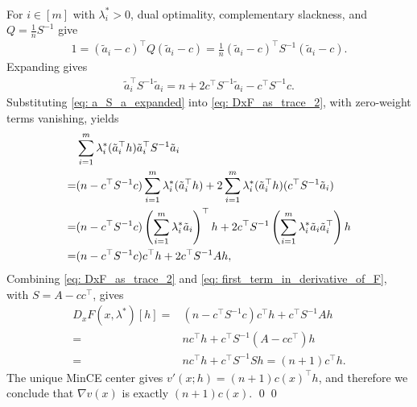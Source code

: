 \documentclass[smallextended]{svjour3}
\let\springerproof\proof
\let\endspringerproof\endproof
\renewenvironment{proof}{\springerproof}{%
  \ifhmode\qed\else\leavevmode\qed\fi\endspringerproof}
\begin{document}
\begin{proof}
\begin{align}
    \end{align}
    For $i\in[m]$ with $\lambda_i^*>0$,
    dual optimality, complementary slackness, and $Q=\frac1nS^{-1}$ give
    \begin{align*}
        1 = (\tilde{a}_i - c)^\top Q (\tilde{a}_i - c) = \frac{1}{n}(\tilde{a}_i - c)^\top S^{-1} (\tilde{a}_i - c).
    \end{align*}
    Expanding gives
    \begin{align}\label{eq: a_S_a_expanded}
        \tilde{a}_i^\top S^{-1}\tilde{a}_i = n + 2c^\top S^{-1}\tilde{a}_i -c^\top S^{-1}c.
    \end{align}
    Substituting \eqref{eq: a_S_a_expanded} into
    \eqref{eq: DxF_as_trace_2}, with zero-weight terms vanishing, yields
    \begin{align}
        & \sum_{i=1}^m \lambda_i^* (\tilde{a}_i^\top h) \tilde{a}_i ^\top S^{-1} \tilde{a}_i  \notag \\
        = & (n-c^\top S^{-1}c )\sum_{i=1}^m \lambda_i^* (\tilde{a}_i^\top h) + 2 \sum_{i=1}^m \lambda_i^* (\tilde{a}_i^\top h) (c^\top S^{-1}\tilde{a}_i) \notag\\
        = & (n-c^\top S^{-1}c) \left(\sum_{i=1}^m \lambda^*_i \tilde{a}_i\right)^\top h + 2c^\top S^{-1} \left(\sum_{i=1}^m \lambda_i^*\tilde{a}_i\tilde{a}_i^\top\right)h \notag \\
        = & (n-c^\top S^{-1}c)c^\top h + 2c^\top S^{-1}Ah,\label{eq: first_term_in_derivative_of_F}
    \end{align}
    Combining \eqref{eq: DxF_as_trace_2} and
    \eqref{eq: first_term_in_derivative_of_F}, with $S=A-cc^\top$, gives
    \begin{align*}
        D_xF(x, \lambda^*)[h] = & (n-c^\top S^{-1}c)c^\top h + c^\top S^{-1}Ah \\
        = & n c^\top h + c^\top S^{-1}(A - cc^\top)h\\
        = & n c^\top h + c^\top S^{-1}S h = (n+1) c^\top h.
    \end{align*}
    The unique MinCE center gives
    $v'(x;h)=(n+1)c(x)^\top h$, and therefore we conclude that $\nabla v(x)$ is exactly $(n+1)c(x)$.
\end{proof}
\end{document}
